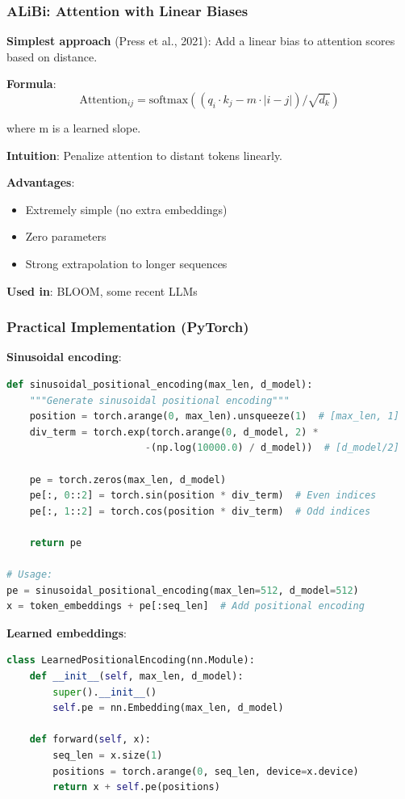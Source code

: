 \documentclass[11pt,oneside]{book}
\begin{document}
\subsubsection{ALiBi: Attention with Linear Biases}

\textbf{Simplest approach} (Press et al., 2021): Add a linear bias to attention scores based on distance.

\textbf{Formula}:
\[
\text{Attention}_{ij} = \text{softmax}((q_i \cdot k_j - m \cdot |i-j|) / \sqrt{d_k})
\]

where m is a learned slope.

\textbf{Intuition}: Penalize attention to distant tokens linearly.

\textbf{Advantages}:
\begin{itemize}
\item Extremely simple (no extra embeddings)
\item Zero parameters
\item Strong extrapolation to longer sequences
\end{itemize}

\textbf{Used in}: BLOOM, some recent LLMs

\subsubsection{Practical Implementation (PyTorch)}

\textbf{Sinusoidal encoding}:
\begin{lstlisting}[language=Python]
def sinusoidal_positional_encoding(max_len, d_model):
    """Generate sinusoidal positional encoding"""
    position = torch.arange(0, max_len).unsqueeze(1)  # [max_len, 1]
    div_term = torch.exp(torch.arange(0, d_model, 2) *
                        -(np.log(10000.0) / d_model))  # [d_model/2]

    pe = torch.zeros(max_len, d_model)
    pe[:, 0::2] = torch.sin(position * div_term)  # Even indices
    pe[:, 1::2] = torch.cos(position * div_term)  # Odd indices

    return pe

# Usage:
pe = sinusoidal_positional_encoding(max_len=512, d_model=512)
x = token_embeddings + pe[:seq_len]  # Add positional encoding
\end{lstlisting}

\textbf{Learned embeddings}:
\begin{lstlisting}[language=Python]
class LearnedPositionalEncoding(nn.Module):
    def __init__(self, max_len, d_model):
        super().__init__()
        self.pe = nn.Embedding(max_len, d_model)

    def forward(self, x):
        seq_len = x.size(1)
        positions = torch.arange(0, seq_len, device=x.device)
        return x + self.pe(positions)
\end{lstlisting}
\end{document}
